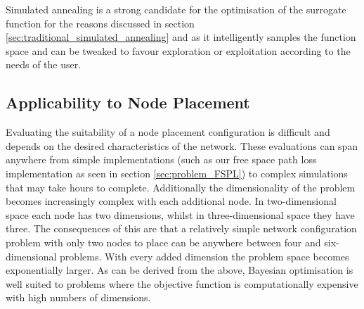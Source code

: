 		Simulated annealing is a strong candidate for the optimisation of the surrogate function for the reasons discussed in section \ref{sec:traditional_simulated_annealing} and as it intelligently samples the function space and can be tweaked to favour exploration or exploitation according to the needs of the user.
	
	\subsection{Applicability to Node Placement} 
		\label{sec:bayesian_applicability} 
		Evaluating the suitability of a node placement configuration is difficult and depends on the desired characteristics of the network. These evaluations can span anywhere from simple implementations (such as our free space path loss implementation as seen in section \ref{sec:problem_FSPL}) to complex simulations that may take hours to complete. Additionally the dimensionality of the problem becomes increasingly complex with each additional node. In two-dimensional space each node has two dimensions, whilst in three-dimensional space they have three. The consequences of this are that a relatively simple network configuration problem with only two nodes to place can be anywhere between four and six-dimensional problems. With every added dimension the problem space becomes exponentially larger. As can be derived from the above, Bayesian optimisation is well suited to problems where the objective function is computationally expensive with high numbers of dimensions\cite{shahriari2015taking}. 

		